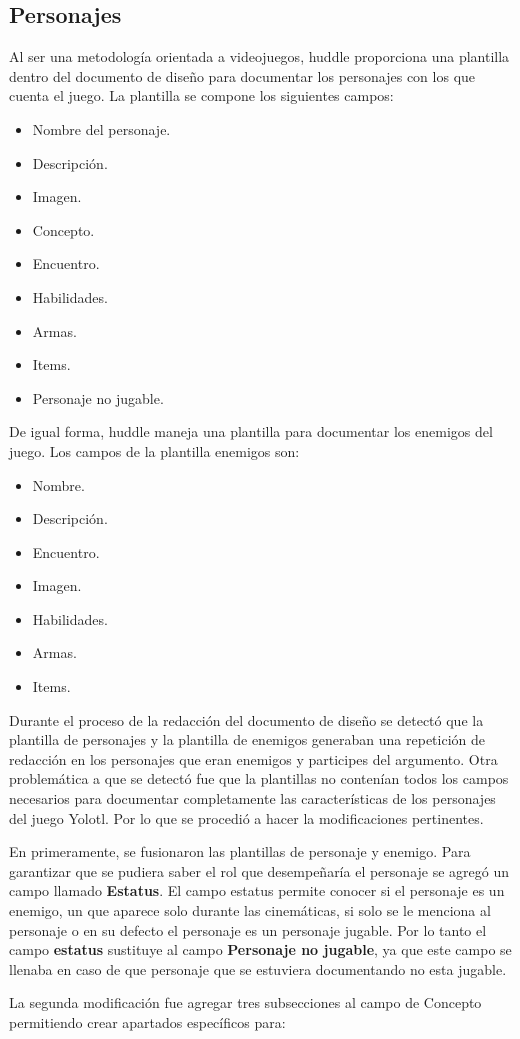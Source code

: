 \subsection{Personajes}
Al ser una metodología orientada a videojuegos, huddle proporciona una plantilla 
dentro del documento de diseño para documentar los personajes con los que cuenta 
el juego. La plantilla se compone los siguientes campos:
	\begin{itemize}
		\item Nombre del personaje.
		\item Descripción. 
		\item Imagen.
		\item Concepto. 
		\item Encuentro. 
		\item Habilidades. 
		\item Armas.
		\item Items.  
		\item Personaje no jugable. 
	\end{itemize}
	De igual forma, huddle maneja una plantilla para documentar los enemigos del 
	juego. Los campos de la plantilla enemigos son:
	\begin{itemize}
		\item Nombre.
		\item Descripción.
		\item Encuentro.
		\item Imagen.
		\item Habilidades.
		\item Armas.
		\item Items.
	\end{itemize}
	Durante el proceso de la redacción del documento de diseño se detectó que la 
	plantilla de personajes y la plantilla de enemigos generaban una repetición de 
	redacción en los personajes que eran enemigos y participes del argumento. Otra 
	problemática a que se detectó fue que la plantillas no contenían todos los campos 
	necesarios para documentar completamente las características de los personajes del 
	juego Yolotl. Por lo que se procedió a hacer la modificaciones pertinentes.
\\
\par	
	En primeramente, se fusionaron las plantillas de personaje y enemigo. Para 
	garantizar que se pudiera saber el rol que desempeñaría el personaje se agregó 
	un campo llamado \textbf{Estatus}.  El campo estatus permite conocer si el 
	personaje es un enemigo, un que aparece solo durante las cinemáticas, si solo 
	se le menciona al personaje o en su defecto el personaje es un personaje jugable. 
	Por lo tanto el campo \textbf{estatus} sustituye al campo \textbf{Personaje no 
	jugable}, ya que este campo se llenaba en caso de que personaje que se estuviera 
	documentando no esta jugable.
	\\
	\par
La segunda modificación fue agregar tres subsecciones al campo de Concepto 
permitiendo  crear apartados específicos para:

